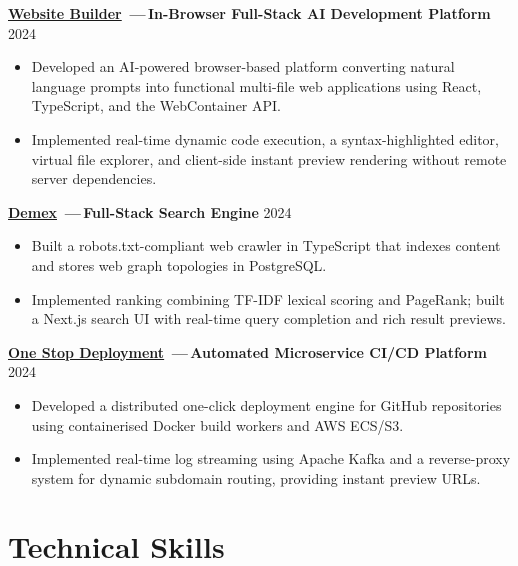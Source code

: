 \documentclass[11pt,a4paper]{article}
\begin{document}
\vspace{0.35em}

\textbf{\href{https://github.com/jayraj-kl/website-builder}{Website Builder}%
\,---\,In-Browser Full-Stack AI Development Platform}
\hfill 2024
\begin{itemize}
  \item Developed an AI-powered browser-based platform converting natural language prompts into functional multi-file web applications using React, TypeScript, and the WebContainer API.
  \item Implemented real-time dynamic code execution, a syntax-highlighted editor, virtual file explorer, and client-side instant preview rendering without remote server dependencies.
\end{itemize}

\vspace{0.35em}

\textbf{\href{https://github.com/jayraj-kl/demex-engine}{Demex}%
\,---\,Full-Stack Search Engine}
\hfill 2024
\begin{itemize}
  \item Built a robots.txt-compliant web crawler in TypeScript that indexes content and stores web graph topologies in PostgreSQL.
  \item Implemented ranking combining TF-IDF lexical scoring and PageRank; built a Next.js search UI with real-time query completion and rich result previews.
\end{itemize}

\vspace{0.35em}

\textbf{\href{https://github.com/jayraj-kl}{One Stop Deployment}%
\,---\,Automated Microservice CI/CD Platform}
\hfill 2024
\begin{itemize}
  \item Developed a distributed one-click deployment engine for GitHub repositories using containerised Docker build workers and AWS ECS/S3.
  \item Implemented real-time log streaming using Apache Kafka and a reverse-proxy system for dynamic subdomain routing, providing instant preview URLs.
\end{itemize}


\section{Technical Skills}
\end{document}
